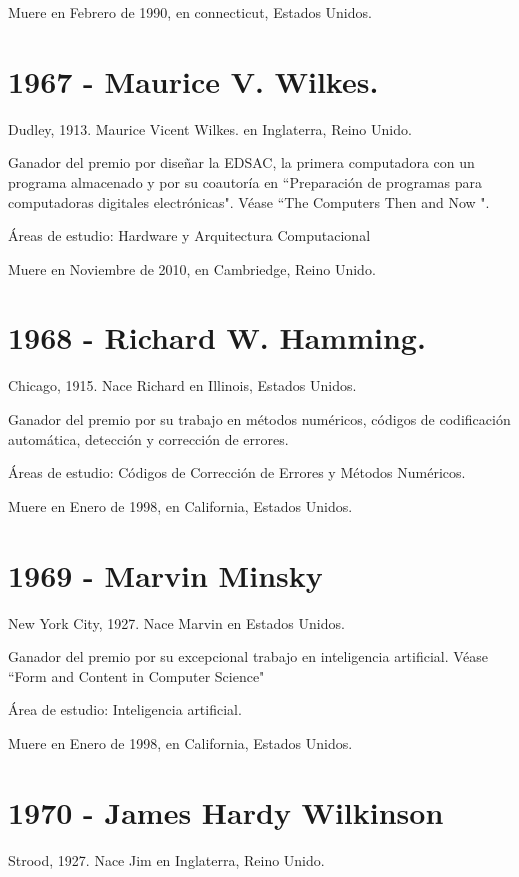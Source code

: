 \documentclass[a4paper, 11pt]{article}
\begin{document}
\noindent Muere en Febrero de 1990, en connecticut, Estados Unidos.
\newline

\section*{1967 - Maurice V. Wilkes.}
\noindent Dudley, 1913. Maurice Vicent Wilkes. en Inglaterra, Reino Unido. 

\noindent Ganador del premio por diseñar la EDSAC, la primera computadora con un programa almacenado y por su coautoría en ``Preparación de programas para computadoras digitales electrónicas". Véase ``The Computers Then and Now ".

\noindent Áreas de estudio: Hardware y Arquitectura Computacional

\noindent Muere en Noviembre de 2010, en Cambriedge, Reino Unido.
\newline

\section*{1968 - Richard W. Hamming.}
\noindent Chicago, 1915. Nace Richard en Illinois, Estados Unidos.

\noindent Ganador del premio por su trabajo en métodos numéricos, códigos de codificación automática, detección y corrección de errores. 

\noindent Áreas de estudio: Códigos de Corrección de Errores y Métodos Numéricos.

\noindent Muere en Enero de 1998, en California, Estados Unidos.
\newline


\section*{1969 - Marvin Minsky}
\noindent New York City, 1927. Nace Marvin en Estados Unidos.

\noindent Ganador del premio por su excepcional trabajo en inteligencia artificial. Véase ``Form and Content in Computer Science"

\noindent Área de estudio: Inteligencia artificial.

\noindent Muere en Enero de 1998, en California, Estados Unidos.
\newline


\section*{1970 - James Hardy Wilkinson}
\noindent Strood, 1927. Nace Jim en Inglaterra, Reino Unido.
\end{document}
